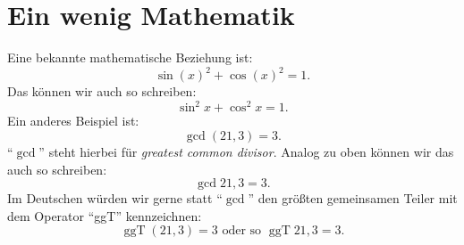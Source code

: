 \documentclass[12pt,a4paper]{scrartcl}
\DeclareMathOperator{\ggT}{ggT}
\begin{document}
%
\section{Ein wenig Mathematik}	
Eine bekannte mathematische Beziehung ist:
%
\[
  \sin(x)^{2} + \cos(x)^{2} = 1.
\]
Das können wir auch so schreiben:
%
\[
  \sin^{2} x + \cos^{2} x = 1.
\]
Ein anderes Beispiel ist:
%
\[
  \gcd(21, 3) = 3.
\]
\enquote{$\gcd$} steht hierbei für \emph{greatest common divisor}.
Analog zu oben können wir das auch so schreiben:
%
\[
  \gcd 21, 3 = 3.
\]
Im Deutschen würden wir gerne statt \enquote{$\gcd$} den größten
gemeinsamen Teiler mit dem Operator \enquote{ggT} kennzeichnen:
%
\[
  \ggT(21, 3) = 3 \text{ oder so } \ggT 21, 3 = 3.
\]
\end{document}
